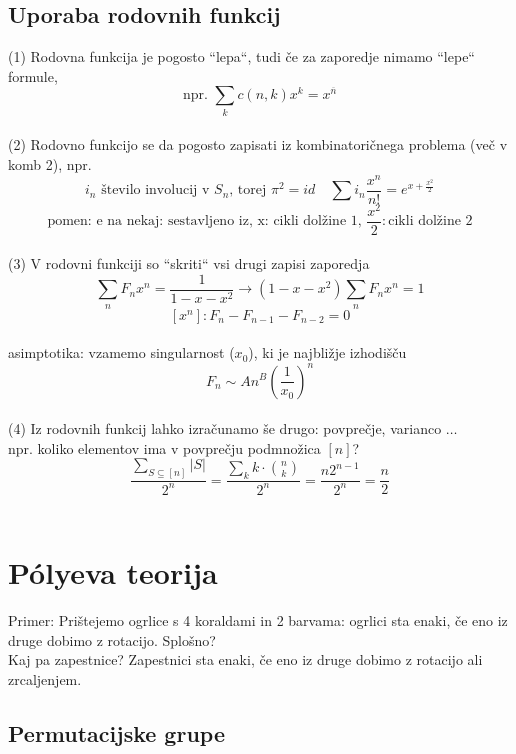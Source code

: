 \documentclass[a4paper,12pt]{article}
\theoremstyle{definition}
\theoremstyle{remark}
\begin{document}


\subsection{Uporaba rodovnih funkcij}

(1) Rodovna funkcija je pogosto ``lepa``, tudi če za zaporedje nimamo ``lepe`` formule,
\[\text{npr. } \sum_k c(n,k)x^k = x^{\overline{n}}\] \\
(2) Rodovno funkcijo se da pogosto zapisati iz kombinatoričnega problema (več v komb 2),
npr. \[i_n \text{ število involucij v } S_n \text{, torej } \pi^2 = id \quad \sum i_n \frac{x^n}{n!} = e^{x+\frac{x^2}{2}}\]
\[\text{pomen: e na nekaj: sestavljeno iz, x: cikli dolžine 1, } \frac{x^2}{2}: \text{cikli dolžine 2}\] \\
(3) V rodovni funkciji so ``skriti`` vsi drugi zapisi zaporedja
\[\sum_n F_n x^n = \frac{1}{1-x-x^2} \to (1-x-x^2) \sum_n F_n x^n = 1\]
\[[x^n]: F_n - F_{n-1} - F_{n-2} = 0 \] \\
asimptotika: vzamemo singularnost ($x_0$), ki je najbližje izhodišču \[F_n \sim An^B(\frac{1}{x_0})^n\] \\
(4) Iz rodovnih funkcij lahko izračunamo še drugo: povprečje, varianco $\dots$ \\
npr. koliko elementov ima v povprečju podmnožica $[n]$?
\[\frac{\sum_{S \subseteq [n]} |S|}{2^n} = \frac{\sum_k k \cdot \binom{n}{k}}{2^n} = \frac{n2^{n-1}}{2^n} = \frac{n}{2}\]
\\

\section{Pólyeva teorija}

Primer: Prištejemo ogrlice s 4 koraldami in 2 barvama: ogrlici sta enaki, če eno iz druge dobimo z rotacijo.
Splošno? \\

Kaj pa zapestnice? Zapestnici sta enaki, če eno iz druge dobimo z rotacijo ali zrcaljenjem. \\


\subsection{Permutacijske grupe}
\end{document}

